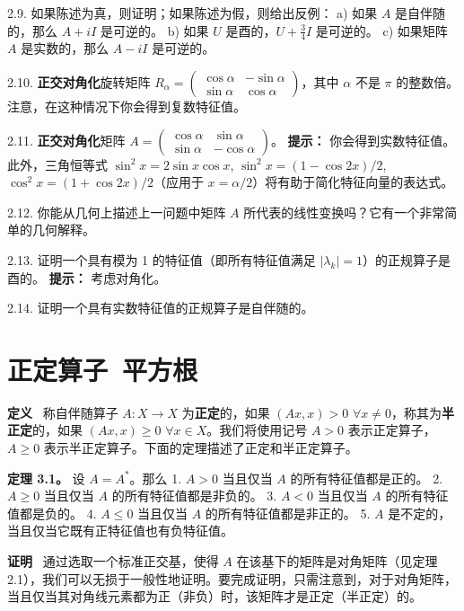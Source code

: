 2.9. 如果陈述为真，则证明；如果陈述为假，则给出反例：
a) 如果 $A$ 是自伴随的，那么 $A + iI$ 是可逆的。
b) 如果 $U$ 是酉的，$U + \frac{3}{4}I$ 是可逆的。
c) 如果矩阵 $A$ 是实数的，那么 $A - iI$ 是可逆的。

2.10. \textbf{正交对角化}旋转矩阵 $R_\alpha = \begin{pmatrix} \cos \alpha & -\sin \alpha \\ \sin \alpha & \cos \alpha \end{pmatrix}$，其中 $\alpha$ 不是 $\pi$ 的整数倍。注意，在这种情况下你会得到复数特征值。

2.11. \textbf{正交对角化}矩阵 $A = \begin{pmatrix} \cos \alpha & \sin \alpha \\ \sin \alpha & -\cos \alpha \end{pmatrix}$。
\textbf{提示：} 你会得到实数特征值。此外，三角恒等式 $\sin^2 x = 2 \sin x \cos x$, $\sin^2 x = (1 - \cos 2x)/2$, $\cos^2 x = (1 + \cos 2x)/2$（应用于 $x = \alpha/2$）将有助于简化特征向量的表达式。

2.12. 你能从几何上描述上一问题中矩阵 $A$ 所代表的线性变换吗？它有一个非常简单的几何解释。

2.13. 证明一个具有模为 1 的特征值（即所有特征值满足 $|\lambda_k| = 1$）的正规算子是酉的。
\textbf{提示：} 考虑对角化。

2.14. 证明一个具有实数特征值的正规算子是自伴随的。




\section{正定算子~平方根}
\textbf{定义}~ 称自伴随算子 $A: X \to X$ 为\textbf{正定}的，如果 $(Ax, x) > 0$ $\forall x \neq 0$，称其为\textbf{半正定}的，如果 $(Ax, x) \geq 0$ $\forall x \in X$。我们将使用记号 $A > 0$ 表示正定算子，$A \geq 0$ 表示半正定算子。下面的定理描述了正定和半正定算子。

\textbf{定理 3.1。} 设 $A = A^*$。那么
1. $A > 0$ 当且仅当 $A$ 的所有特征值都是正的。
2. $A \geq 0$ 当且仅当 $A$ 的所有特征值都是非负的。
3. $A < 0$ 当且仅当 $A$ 的所有特征值都是负的。
4. $A \leq 0$ 当且仅当 $A$ 的所有特征值都是非正的。
5. $A$ 是不定的，当且仅当它既有正特征值也有负特征值。

\textbf{证明}~ 通过选取一个标准正交基，使得 $A$ 在该基下的矩阵是对角矩阵（见定理 2.1），我们可以无损于一般性地证明。要完成证明，只需注意到，对于对角矩阵，当且仅当其对角线元素都为正（非负）时，该矩阵才是正定（半正定）的。


